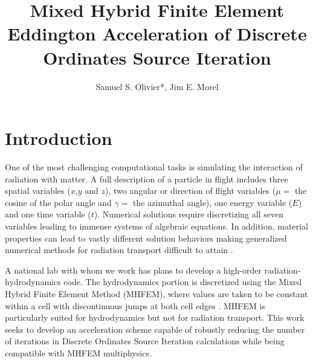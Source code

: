 \documentclass{anstrans}
\title{Mixed Hybrid Finite Element Eddington Acceleration of Discrete Ordinates Source Iteration}
\author{Samuel S. Olivier*, Jim E. Morel}
\institute{Department of Nuclear Engineering, Texas A\&M University, College Station, TX 77843}
\begin{document}
\section{Introduction}
	One of the most challenging computational tasks is simulating the interaction of radiation with matter. 
	A full description of a particle in flight includes three spatial variables ($x$,$y$ and $z$), two angular or direction of flight variables ($\mu =$ the cosine of the polar angle and $\gamma =$ the azimuthal angle), one energy variable ($E$) and one time variable ($t$). Numerical solutions require discretizing all seven variables leading to immense systems of algebraic equations. In addition, material properties can lead to vastly different solution behaviors making generalized numerical methods for radiation transport difficult to attain \cite{adams}. 



	A national lab with whom we work has plans to develop a high-order radiation-hydrodynamics code. The hydrodynamics portion is discretized using the Mixed Hybrid Finite Element Method (MHFEM), where values are taken to be constant within a cell with discontinuous jumps at both cell edges \cite{mhfem}. MHFEM is particularly suited for hydrodynamics but not for radiation transport. This work seeks to develop an acceleration scheme capable of robustly reducing the number of iterations in Discrete Ordinates Source Iteration calculations while being compatible with MHFEM multiphysics.   
\end{document}
